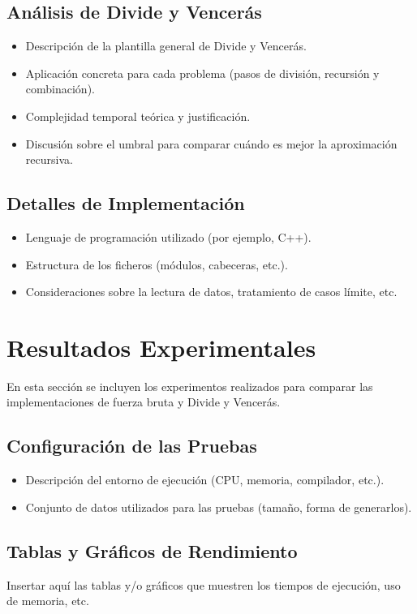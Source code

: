 \documentclass[a4paper,12pt]{article}
\begin{document}
\subsection{Análisis de Divide y Vencerás}
\begin{itemize}
    \item Descripción de la plantilla general de Divide y Vencerás.
    \item Aplicación concreta para cada problema (pasos de división, recursión y combinación).
    \item Complejidad temporal teórica y justificación.
    \item Discusión sobre el umbral para comparar cuándo es mejor la aproximación recursiva.
\end{itemize}

\subsection{Detalles de Implementación}
\begin{itemize}
    \item Lenguaje de programación utilizado (por ejemplo, C++).
    \item Estructura de los ficheros (módulos, cabeceras, etc.).
    \item Consideraciones sobre la lectura de datos, tratamiento de casos límite, etc.
\end{itemize}

\section{Resultados Experimentales}
En esta sección se incluyen los experimentos realizados para comparar 
las implementaciones de fuerza bruta y Divide y Vencerás.

\subsection{Configuración de las Pruebas}
\begin{itemize}
    \item Descripción del entorno de ejecución (CPU, memoria, compilador, etc.).
    \item Conjunto de datos utilizados para las pruebas (tamaño, forma de generarlos).
\end{itemize}

\subsection{Tablas y Gráficos de Rendimiento}
Insertar aquí las tablas y/o gráficos que muestren los tiempos de ejecución, 
uso de memoria, etc.
\end{document}
